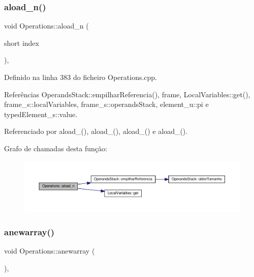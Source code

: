 \subsubsection{\texorpdfstring{aload\+\_\+n()}{aload\_n()}}
{\footnotesize\ttfamily void Operations\+::aload\+\_\+n (\begin{DoxyParamCaption}\item[{short}]{index }\end{DoxyParamCaption})\hspace{0.3cm}{\ttfamily [static]}, {\ttfamily [private]}}



Definido na linha 383 do ficheiro Operations.\+cpp.



Referências Operands\+Stack\+::empilhar\+Referencia(), frame, Local\+Variables\+::get(), frame\+\_\+s\+::local\+Variables, frame\+\_\+s\+::operands\+Stack, element\+\_\+u\+::pi e typed\+Element\+\_\+s\+::value.



Referenciado por aload\+\_(), aload\+\_(), aload\+\_() e aload\+\_().

Grafo de chamadas desta função\+:\nopagebreak
\begin{figure}[H]
\begin{center}
\leavevmode
\includegraphics[width=350pt]{classOperations_ad148cdfeb25166f5c097cee60ea36325_cgraph}
\end{center}
\end{figure}
\mbox{\label{classOperations_aa5110e66aa565e9130be292935ef5c71}} 
\subsubsection{\texorpdfstring{anewarray()}{anewarray()}}
{\footnotesize\ttfamily void Operations\+::anewarray (\begin{DoxyParamCaption}{ }\end{DoxyParamCaption})\hspace{0.3cm}{\ttfamily [static]}, {\ttfamily [private]}}



